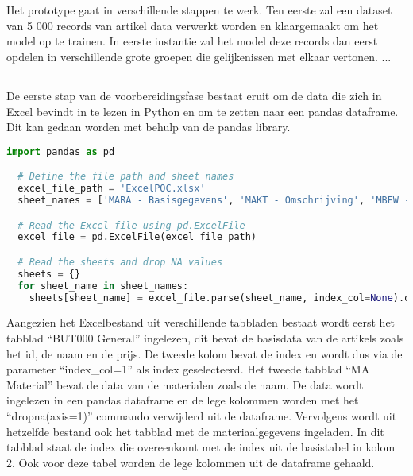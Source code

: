 
\chapter{}%
\label{ch:ProofOfConcept}
Het prototype gaat in verschillende stappen te werk. Ten eerste zal een dataset van 5 000 records van artikel data verwerkt worden en klaargemaakt om het model op te trainen. In eerste instantie zal het model deze records dan eerst opdelen in verschillende grote groepen die gelijkenissen met elkaar vertonen. ...

\section{}%
\label{sec:model}

De eerste stap van de voorbereidingsfase bestaat eruit om de data die zich in Excel bevindt in te lezen in Python en om te zetten naar een pandas dataframe. Dit kan gedaan worden met behulp van de pandas library.

\begin{lstlisting}[language=Python, caption={Het inlezen van Excel-gegevens in een pandas dataframe.}]
  import pandas as pd

  # Define the file path and sheet names
  excel_file_path = 'ExcelPOC.xlsx'
  sheet_names = ['MARA - Basisgegevens', 'MAKT - Omschrijving', 'MBEW - Boekhouding']

  # Read the Excel file using pd.ExcelFile
  excel_file = pd.ExcelFile(excel_file_path)

  # Read the sheets and drop NA values
  sheets = {}
  for sheet_name in sheet_names:
    sheets[sheet_name] = excel_file.parse(sheet_name, index_col=None).dropna(axis=1)
\end{lstlisting}

Aangezien het Excelbestand uit verschillende tabbladen bestaat wordt eerst het tabblad ``BUT000 \textendash General'' ingelezen, dit bevat de basisdata van de artikels zoals het id, de naam en de prijs. De tweede kolom bevat de index en wordt dus via de parameter ``index\_col=1'' als index geselecteerd. Het tweede tabblad ``MA \textendash Material'' bevat de data van de materialen zoals de naam. De data wordt ingelezen in een pandas dataframe en de lege kolommen worden met het ``dropna(axis=1)'' commando verwijderd uit de dataframe.
Vervolgens wordt uit hetzelfde bestand ook het tabblad met de materiaalgegevens ingeladen. In dit tabblad staat de index die overeenkomt met de index uit de basistabel in kolom 2. Ook voor deze tabel worden de lege kolommen uit de dataframe gehaald.

